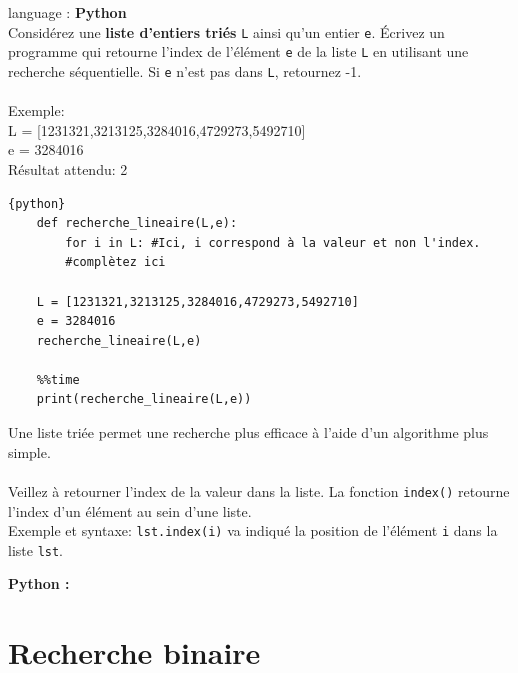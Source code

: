 \begin{Exercice}[5 minutes] language : \textbf{Python}\\

    Considérez une \textbf{liste d’entiers triés} \lstinline{L} ainsi qu’un entier \lstinline{e}. Écrivez un programme qui retourne l'index de l'élément \lstinline{e} de la liste \lstinline{L} en utilisant une recherche séquentielle. Si \lstinline{e} n’est pas dans \lstinline{L}, retournez -1.\\\\
    
    Exemple:\\
    L = [1231321,3213125,3284016,4729273,5492710]\\
    e = 3284016\\
    Résultat attendu: 2\\
  
\begin{lstlisting}{python}
    def recherche_lineaire(L,e):
        for i in L: #Ici, i correspond à la valeur et non l'index.
        #complètez ici 
        
    L = [1231321,3213125,3284016,4729273,5492710]
    e = 3284016
    recherche_lineaire(L,e)
    
    %%time
    print(recherche_lineaire(L,e))
\end{lstlisting}

    \begin{conseil}
        Une liste triée permet une recherche plus efficace à l'aide d'un algorithme plus simple.\\\\
        Veillez à retourner l'index de la valeur dans la liste. La fonction \lstinline{index()} retourne l'index d'un élément au sein d'une liste.\\Exemple et syntaxe: \lstinline{lst.index(i)} va indiqué la position de l'élément \lstinline{i} dans la liste \lstinline{lst}.
    \end{conseil}


    \begin{solution}
        \textbf{Python :}
        
    \end{solution}
\end{Exercice}

\newpage
\section{Recherche binaire}

